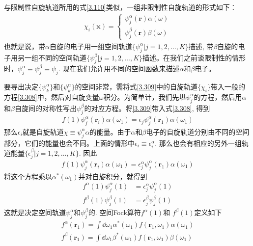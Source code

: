 {与限制性自旋轨道所用的式\eqref{3.110}类似，一组非限制性自旋轨道的形式如下：
\begin{align}
\chi_i(\mathbf{x}) =
\begin{cases*}
\psi_j^\alpha(\mathbf{r})\alpha(\omega)\\
\psi_j^\beta (\mathbf{r})\beta(\omega)
\end{cases*}
\end{align}
也就是说，带$\alpha$自旋的电子用一组空间轨道$\{\psi_j^\alpha |j=1,2,\ldots,K \}$描述, 带$\beta$自旋的电子用另一组不同的空间轨道$\{\psi_j^\beta |j=1,2,\ldots,K \}$描述。在我们之前谈限制性的情形时，$\psi_j^\alpha \equiv \psi_j^\beta \equiv \psi_j$. 现在我们允许用不同的空间函数来描述$\alpha$和$\beta$电子。

要导出决定$\{\psi_k^\alpha \}$和$\{\psi_k^\alpha \}$的空间非常，需将式\eqref{3.309}中的自旋轨道$\{\chi_i\}$带入一般的\hft 方程\eqref{3.308}中，然后对自旋变量$\omega$积分。为简单计，我们先堪$\psi_j^\alpha$的方程，然后用$\alpha$和$\beta$自旋间的对称性写出$\psi_j^\beta$的对应方程。将\eqref{3.309}带入式\eqref{3.308}, 得到
\begin{align}
f(1)\psi_j^\alpha(\mathbf{r}_i) \alpha(\omega_1) = \epsilon_j \psi_j^\alpha(\mathbf{r}_1) \alpha(\omega_1)
\end{align}
那么$\epsilon_i$就是自旋轨道$\chi\equiv\psi_j^\alpha\alpha$的能量。由于$\alpha$和$\beta$电子的自旋轨道分别由不同的空间部分，它们的能量也会不同。上面的情形中$\epsilon_i\equiv\epsilon^\alpha_i$. 那么也会有相应的另外一组轨道能量$\{\epsilon_j^\beta | j=1,2,\ldots,K\}$. 因此
\begin{align}
f(1)\psi_j^\alpha(\mathbf{r}_i) \alpha(\omega_1) = \epsilon_j^\alpha \psi_j^\alpha(\mathbf{r}_1) \alpha(\omega_1)
\end{align}
将这个方程乘以$\alpha^*(\omega_1)$并对自旋积分，就得到
\begin{align}
f^\alpha(1)\psi_j^\alpha(1) & = \epsilon_j^\alpha \psi_j^\alpha(1)\\
f^\beta (1)\psi_j^\beta(1)  & = \epsilon_j^\beta \psi_j^\beta(1)
\end{align}
这就是决定空间轨道$\psi_j^\alpha$和$\psi_j^\beta$的. 空间Fock算符$f^\alpha(1)$和 $f^\beta (1)$定义如下
\begin{align}
f^\alpha(\mathbf{r}_1) = \int\dd\omega_1 \alpha^*(\omega_1) f(\mathbf{r}_1,\omega_1)\alpha(\omega_1)\\
f^\beta(\mathbf{r}_1) = \int\dd\omega_1 \beta^*(\omega_1) f(\mathbf{r}_1,\omega_1)\beta(\omega_1)
\end{align}

}
